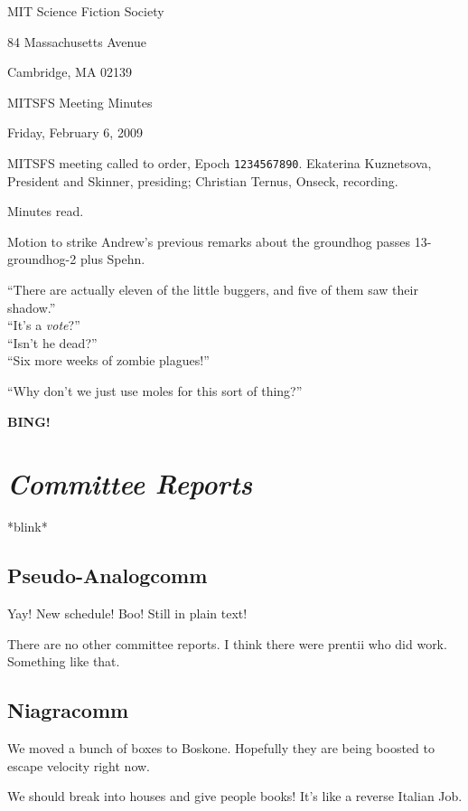 \documentclass[10pt]{article}
\newcommand{\bing}{{\bf BING!} }
\newcommand{\goto}[1]{\bing \vskip 12pt \section*{{\em{#1}}}}
\newcommand{\ps}{ plus Spehn\xspace}
\begin{document}
\begin{center}

MIT Science Fiction Society

84 Massachusetts Avenue

Cambridge, MA 02139

\vspace{12pt}

MITSFS Meeting Minutes

Friday, February 6, 2009

\end{center}

\vspace{18pt}

\setlength{\parskip}{6pt}

\noindent
MITSFS meeting called to order, Epoch \texttt{1234567890}.
Ekaterina Kuznetsova, President and Skinner, presiding; Christian Ternus, Onseck, recording.

Minutes read.

Motion to strike Andrew's previous remarks about the groundhog passes 13-groundhog-2\ps.

``There are actually eleven of the little buggers, and five of them saw their shadow.''\\
``It's a \emph{vote}?''\\
``Isn't he dead?''\\
``Six more weeks of zombie plagues!''

``Why don't we just use moles for this sort of thing?''

\goto{Committee Reports}

*blink*

\subsection*{Pseudo-Analogcomm}

Yay!  New schedule!  Boo!  Still in plain text!

There are no other committee reports.  I think there were prentii who
did work.  Something like that.

\subsection*{Niagracomm}

We moved a bunch of boxes to Boskone.  Hopefully they are being
boosted to escape velocity right now.

We should break into houses and give people books!  It's like a reverse Italian Job.
\end{document}
